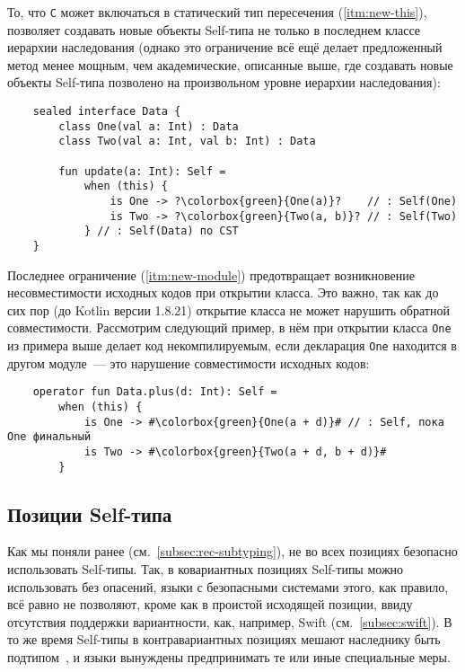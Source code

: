 То, что \texttt{C} может включаться в статический тип пересечения (\ref{itm:new-this}), позволяет создавать новые объекты Self-типа не только в последнем классе иерархии наследования (однако это ограничение всё ещё делает предложенный метод менее мощным, чем академические, описанные выше, где создавать новые объекты Self-типа позволено на произвольном уровне иерархии наследования):

\begin{verbatim}
    sealed interface Data {
        class One(val a: Int) : Data
        class Two(val a: Int, val b: Int) : Data

        fun update(a: Int): Self =
            when (this) {
                is One -> ?\colorbox{green}{One(a)}?    // : Self(One)
                is Two -> ?\colorbox{green}{Two(a, b)}? // : Self(Two)
            } // : Self(Data) по CST
    }
\end{verbatim}

Последнее ограничение (\ref{itm:new-module}) предотвращает возникновение несовместимости исходных кодов при открытии класса.
Это важно, так как до сих пор (до Kotlin версии 1.8.21) открытие класса не может нарушить обратной совместимости.
Рассмотрим следующий пример, в нём при открытии класса \texttt{One} из примера выше делает код некомпилируемым, если декларация \texttt{One} находится в другом модуле~--- это нарушение совместимости исходных кодов:

\begin{verbatim}
    operator fun Data.plus(d: Int): Self =
        when (this) {
            is One -> #\colorbox{green}{One(a + d)}# // : Self, пока One финальный
            is Two -> #\colorbox{green}{Two(a + d, b + d)}#
        }
\end{verbatim}


\subsection{Позиции Self-типа} \label{subsec:self-positions}

Как мы поняли ранее (см.~\ref{subsec:rec-subtyping}), не во всех позициях безопасно использовать Self-типы.
Так, в ковариантных позициях Self-типы можно использовать без опасений, языки с безопасными системами этого, как правило, всё равно не позволяют, кроме как в проистой исходящей позиции, ввиду отсутствия поддержки вариантности, как, например, Swift (см.~\ref{subsec:swift}).
В то же время Self-типы в контравариантных позициях мешают наследнику быть подтипом~\cite{cook1989inheritance}, и языки вынуждены предпринимать те или иные специальные меры.

